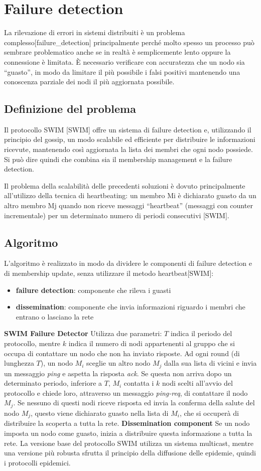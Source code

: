 \section{Failure detection}
La rilevazione di errori in sistemi distribuiti è un problema complesso[failure\_detection] principalmente perché molto spesso un processo può sembrare problematico anche se in realtà è semplicemente lento oppure la connessione è limitata. È necessario verificare con accuratezza che un nodo sia “guasto”, in modo da limitare il più possibile i falsi positivi mantenendo una conoscenza parziale dei nodi il più aggiornata possibile. 
\subsection{Definizione del problema}
Il protocollo SWIM [SWIM] offre un sistema di failure detection e, utilizzando il principio del gossip, un modo scalabile ed efficiente per distribuire le informazioni ricevute, mantenendo così aggiornata la lista dei membri che ogni nodo possiede. Si può dire quindi che combina sia il membership management e la failure detection.

Il problema della scalabilità delle precedenti soluzioni è dovuto principalmente all’utilizzo della tecnica di heartbeating: un membro Mi è dichiarato guasto da un altro membro Mj quando non riceve messaggi “heartbeat” (messaggi con counter incrementale) per un determinato numero di periodi consecutivi [SWIM].
\subsection{Algoritmo}
L’algoritmo è realizzato in modo da dividere le componenti di failure detection e di membership update, senza utilizzare il metodo heartbeat[SWIM]:
\begin{itemize}
    \item \textbf{failure detection}: componente che rileva i guasti
    \item \textbf{dissemination}: componente che invia informazioni riguardo i membri che entrano o lasciano la rete
\end{itemize}

\textbf{SWIM Failure Detector} Utilizza due parametri: $T$ indica il periodo del protocollo, mentre $k$ indica il numero di nodi appartenenti al gruppo che si occupa di contattare un nodo che non ha inviato risposte. Ad ogni round (di lunghezza $T$), un nodo $M_i$ sceglie un altro nodo $M_j$ dalla sua lista di vicini e invia un messaggio \textit{ping} e aspetta la risposta \textit{ack}. Se questa non arriva dopo un determinato periodo, inferiore a $T$, $M_i$ contatta i $k$ nodi scelti all’avvio del protocollo e chiede loro, attraverso un messaggio \textit{ping-req}, di contattare il nodo $M_j$. Se nessuno di questi nodi riceve risposta ed invia la conferma della salute del nodo $M_j$, questo viene dichiarato guasto nella lista di $M_i$, che si occuperà di distribuire la scoperta a tutta la rete.
\textbf{Dissemination component} Se un nodo imposta un nodo come guasto, inizia a distribuire questa informazione a tutta la rete. La versione base del protocollo SWIM utilizza un sistema multicast, mentre una versione più robusta sfrutta il principio della diffusione delle epidemie, quindi i protocolli epidemici.
